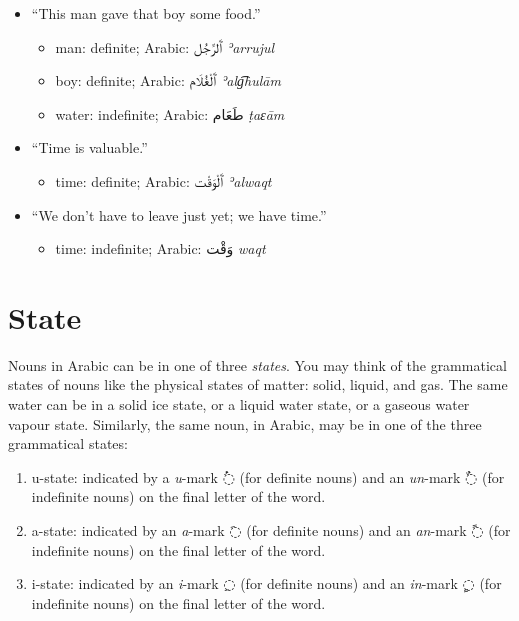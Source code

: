 \documentclass[
  10pt,
]{book}
\providecommand{\tightlist}{%
  \setlength{\itemsep}{0pt}\setlength{\parskip}{0pt}}
\begin{document}
\begin{itemize}
\tightlist
\item
  \enquote{This man gave that boy some food.}

  \begin{itemize}
  \tightlist
  \item
    man: definite; Arabic: \foreignlanguage{arabic}{ٱَلرَّجُل} \emph{ʾarrujul}
  \item
    boy: definite; Arabic: \foreignlanguage{arabic}{ٱَلْغُلَام} \emph{ʾalg͡hulām}
  \item
    water: indefinite; Arabic: \foreignlanguage{arabic}{طَعَام} \emph{ṭaɛām}
  \end{itemize}
\item
  \enquote{Time is valuable.}

  \begin{itemize}
  \tightlist
  \item
    time: definite; Arabic: \foreignlanguage{arabic}{ٱَلْوَقْت} \emph{ʾalwaqt}
  \end{itemize}
\item
  \enquote{We don't have to leave just yet; we have time.}

  \begin{itemize}
  \tightlist
  \item
    time: indefinite; Arabic: \foreignlanguage{arabic}{وَقْت} \emph{waqt}
  \end{itemize}
\end{itemize}

\section{State}\label{state}

Nouns in Arabic can be in one of three \emph{states}. You may think of the grammatical states of nouns like the physical states of matter: solid, liquid, and gas. The same water can be in a solid ice state, or a liquid water state, or a gaseous water vapour state. Similarly, the same noun, in Arabic, may be in one of the three grammatical states:

\begin{enumerate}
\def\labelenumi{\arabic{enumi}.}
\tightlist
\item
  u-state: indicated by a \emph{u}-mark \foreignlanguage{arabic}{◌ُ} (for definite nouns) and an \emph{un}-mark \foreignlanguage{arabic}{◌ٌ} (for indefinite nouns) on the final letter of the word.
\item
  a-state: indicated by an \emph{a}-mark \foreignlanguage{arabic}{◌َ} (for definite nouns) and an \emph{an}-mark \foreignlanguage{arabic}{◌ً} (for indefinite nouns) on the final letter of the word.
\item
  i-state: indicated by an \emph{i}-mark \foreignlanguage{arabic}{◌ِ} (for definite nouns) and an \emph{in}-mark \foreignlanguage{arabic}{◌ٍ} (for indefinite nouns) on the final letter of the word.
\end{enumerate}
\end{document}
